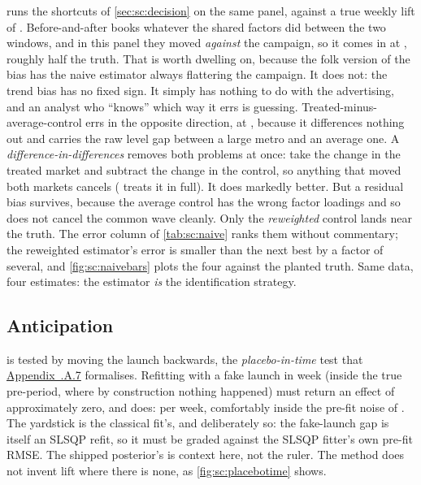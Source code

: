  runs the shortcuts of \cref{sec:sc:decision} on the same panel, against a true
weekly lift of \keur{\nbSevenTrueAvg}. Before-and-after books whatever the shared factors did
between the two windows, and in this panel they moved \emph{against} the campaign, so it comes
in at \keur{\nbSevenNaiveBa}, roughly half the truth. That is worth dwelling on, because the folk
version of the bias has the naive estimator always flattering the campaign. It does not: the trend
bias has no fixed sign. It simply has nothing to do with the advertising, and an analyst who
``knows'' which way it errs is guessing. Treated-minus-average-control errs in the opposite
direction, at \keur{\nbSevenNaiveAvgctrl}, because it differences nothing out and carries the raw
level gap between a large metro and an average one. A \emph{difference-in-differences} removes both
problems at once: take the change in the treated market and subtract the change in the control, so
anything that moved both markets cancels ( treats it in full). It does markedly better.
But a residual bias survives, because the average control
has the wrong factor loadings and so does not cancel the common wave cleanly. Only the
\emph{reweighted} control lands near the truth. The error column of \cref{tab:sc:naive} ranks them
without commentary; the reweighted estimator's error is smaller than the next best by a
factor of several, and \cref{fig:sc:naivebars} plots the four against the planted truth. Same data,
four estimates: the estimator \emph{is} the identification strategy.




\subsection*{Anticipation}

 is tested by moving the launch backwards, the \emph{placebo-in-time} test that
\hyperref[app:sc:placebotimeapp]{Appendix~\thechapter.A.7} formalises. Refitting with a fake launch in week
\nbSevenPlaceboTimeWeek{} (inside the true pre-period, where by construction nothing happened)
must return an effect of approximately zero, and does: \keur{\nbSevenPlaceboTimeGap} per week,
comfortably inside the pre-fit noise of \keur{\nbSevenClPreRmse}. The yardstick is the classical
fit's, and deliberately so: the fake-launch gap is itself an SLSQP refit, so it must be graded
against the SLSQP fitter's own pre-fit RMSE. The shipped posterior's \keur{\nbSevenBayesPreRmse} is
context here, not the ruler. The method does not invent lift where there is none, as
\cref{fig:sc:placebotime} shows.

